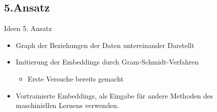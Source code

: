\documentclass[aspectratio=169]{beamer} %
\begin{document}
\subsection{5.Ansatz}
\begin{frame}
    \begin{block}{Ideen 5. Ansatz}
        \begin{itemize}
            \item Graph der Beziehungen der Daten untereinander Darstellt
            \item Imitierung der Embeddings durch Gram-Schmidt-Verfahren
                  \begin{itemize}
                      \item Erste Versuche bereits gemacht
                  \end{itemize}
            \item Vortrainierte Embeddings, als Eingabe f\"ur andere Methoden des maschiniellen Lernens verwenden.
        \end{itemize}
    \end{block}
\end{frame}
\end{document}
